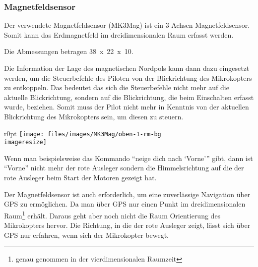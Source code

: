 \subsubsection{Magnetfeldsensor}

Der verwendete Magnetfeldsensor (MK3Mag) ist ein 3-Achsen-Magnetfeldsensor.
Somit kann das Erdmagnetfeld im dreidimensionalen Raum erfasst werden.

Die Abmessungen betragen \unit{38 x 22 x 10}{\milli\metre}.

Die Information der Lage des magnetischen Nordpols
kann dann dazu eingesetzt werden, um die Steuerbefehle des Piloten
von der Blickrichtung des Mikrokopters zu entkoppeln.
Das bedeutet das sich die Steuerbefehle nicht mehr auf die aktuelle Blickrichtung,
sondern auf die Blickrichtung, die beim Einschalten erfasst wurde, beziehen.
Somit muss der Pilot nicht mehr in Kenntnis von der aktuellen Blickrichtung
des Mikrokopters sein, um diesen zu steuern.
\begin{wrapfigure}{r}{0pt}
	\texttt{[image: files/images/MK3Mag/oben-1-rm-bg\\imageresize]}
\end{wrapfigure}
Wenn man beispielsweise das Kommando \enquote{neige dich nach \enquote{Vorne}}
gibt, dann ist \enquote{Vorne} nicht mehr der rote Ausleger sondern
die Himmelsrichtung auf die der rote Ausleger beim Start der Motoren gezeigt hat.

Der Magnetfeldsensor ist auch erforderlich, um eine zuverlässige
Navigation über \ac{GPS} zu ermöglichen.
Da man über \ac{GPS} nur einen Punkt im
dreidimensionalen Raum\footnote{genau genommen in der vierdimensionalen Raumzeit}
erhält.
Daraus geht aber noch nicht die Raum Orientierung des Mikrokopters hervor.
Die Richtung, in die der rote Ausleger zeigt, lässt sich über \ac{GPS} nur erfahren,
wenn sich der Mikrokopter bewegt.
